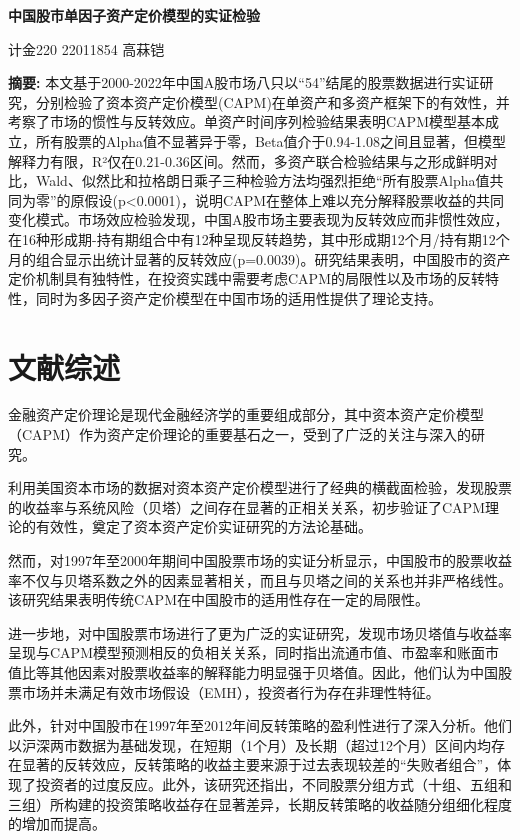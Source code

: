 \documentclass[12pt, a4paper]{article}
\begin{document}
\begin{center}
\LARGE\textbf{中国股市单因子资产定价模型的实证检验}

\vspace{1cm}
\large 计金220 22011854 高菻铠
\end{center}

\noindent \textbf{摘要:} 本文基于2000-2022年中国A股市场八只以“54”结尾的股票数据进行实证研究，分别检验了资本资产定价模型(CAPM)在单资产和多资产框架下的有效性，并考察了市场的惯性与反转效应。单资产时间序列检验结果表明CAPM模型基本成立，所有股票的Alpha值不显著异于零，Beta值介于0.94-1.08之间且显著，但模型解释力有限，R²仅在0.21-0.36区间。然而，多资产联合检验结果与之形成鲜明对比，Wald、似然比和拉格朗日乘子三种检验方法均强烈拒绝“所有股票Alpha值共同为零”的原假设(p<0.0001)，说明CAPM在整体上难以充分解释股票收益的共同变化模式。市场效应检验发现，中国A股市场主要表现为反转效应而非惯性效应，在16种形成期-持有期组合中有12种呈现反转趋势，其中形成期12个月/持有期12个月的组合显示出统计显著的反转效应(p=0.0039)。研究结果表明，中国股市的资产定价机制具有独特性，在投资实践中需要考虑CAPM的局限性以及市场的反转特性，同时为多因子资产定价模型在中国市场的适用性提供了理论支持。

\section{文献综述}

金融资产定价理论是现代金融经济学的重要组成部分，其中资本资产定价模型（CAPM）作为资产定价理论的重要基石之一，受到了广泛的关注与深入的研究。

\citet{fama1973risk}利用美国资本市场的数据对资本资产定价模型进行了经典的横截面检验，发现股票的收益率与系统风险（贝塔）之间存在显著的正相关关系，初步验证了CAPM理论的有效性，奠定了资本资产定价实证研究的方法论基础。

然而，\citet{jin2001capm}对1997年至2000年期间中国股票市场的实证分析显示，中国股市的股票收益率不仅与贝塔系数之外的因素显著相关，而且与贝塔之间的关系也并非严格线性。该研究结果表明传统CAPM在中国股市的适用性存在一定的局限性。

进一步地，\citet{jia2003efficiency}对中国股票市场进行了更为广泛的实证研究，发现市场贝塔值与收益率呈现与CAPM模型预测相反的负相关关系，同时指出流通市值、市盈率和账面市值比等其他因素对股票收益率的解释能力明显强于贝塔值。因此，他们认为中国股票市场并未满足有效市场假设（EMH），投资者行为存在非理性特征。

此外，\citet{shi2015profitability}针对中国股市在1997年至2012年间反转策略的盈利性进行了深入分析。他们以沪深两市数据为基础发现，在短期（1个月）及长期（超过12个月）区间内均存在显著的反转效应，反转策略的收益主要来源于过去表现较差的“失败者组合”，体现了投资者的过度反应。此外，该研究还指出，不同股票分组方式（十组、五组和三组）所构建的投资策略收益存在显著差异，长期反转策略的收益随分组细化程度的增加而提高。
\end{document}
